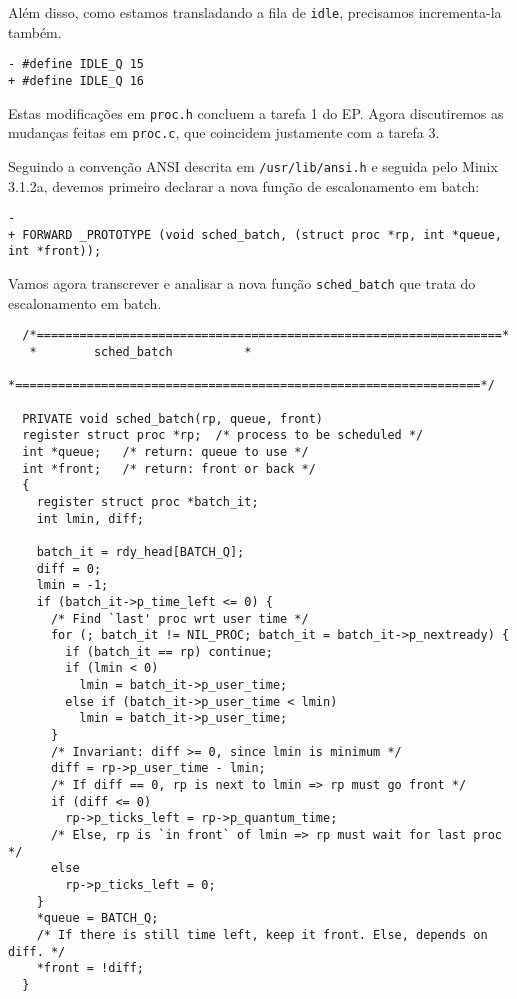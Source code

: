 \documentclass{amsart}
\theoremstyle{plain}
\newcommand{\code}[1]{\lstinline[mathescape=true]{#1}}
\begin{document}
Além disso, como estamos transladando a fila de \code{idle}, precisamos incrementa-la também.

\begin{lstlisting}[frame=leftline,mathescape=true,style=nonumbers]
- #define IDLE_Q 15
+ #define IDLE_Q 16
\end{lstlisting}

Estas modificações em \code{proc.h} concluem a tarefa 1 do EP\@. Agora discutiremos as mudanças
feitas em \code{proc.c}, que coincidem justamente com a tarefa 3.

Seguindo a convenção ANSI descrita em \code{/usr/lib/ansi.h} e seguida pelo Minix 3.1.2a, devemos
primeiro declarar a nova função de escalonamento em batch:

\begin{lstlisting}[frame=leftline,mathescape=true,style=nonumbers]
-
+ FORWARD _PROTOTYPE (void sched_batch, (struct proc *rp, int *queue, int *front));
\end{lstlisting}

Vamos agora transcrever e analisar a nova função \code{sched_batch} que trata do escalonamento em
batch.

\begin{verbatim}
  /*=================================================================*
   *        sched_batch          *
   *=================================================================*/

  PRIVATE void sched_batch(rp, queue, front)
  register struct proc *rp;  /* process to be scheduled */
  int *queue;   /* return: queue to use */
  int *front;   /* return: front or back */
  {
    register struct proc *batch_it;
    int lmin, diff;

    batch_it = rdy_head[BATCH_Q];
    diff = 0;
    lmin = -1;
    if (batch_it->p_time_left <= 0) {
      /* Find `last' proc wrt user time */
      for (; batch_it != NIL_PROC; batch_it = batch_it->p_nextready) {
        if (batch_it == rp) continue;
        if (lmin < 0)
          lmin = batch_it->p_user_time;
        else if (batch_it->p_user_time < lmin)
          lmin = batch_it->p_user_time;
      }
      /* Invariant: diff >= 0, since lmin is minimum */
      diff = rp->p_user_time - lmin;
      /* If diff == 0, rp is next to lmin => rp must go front */
      if (diff <= 0)
        rp->p_ticks_left = rp->p_quantum_time;
      /* Else, rp is `in front` of lmin => rp must wait for last proc */
      else
        rp->p_ticks_left = 0;
    }
    *queue = BATCH_Q;
    /* If there is still time left, keep it front. Else, depends on diff. */
    *front = !diff;
  }
\end{verbatim}
\end{document}
